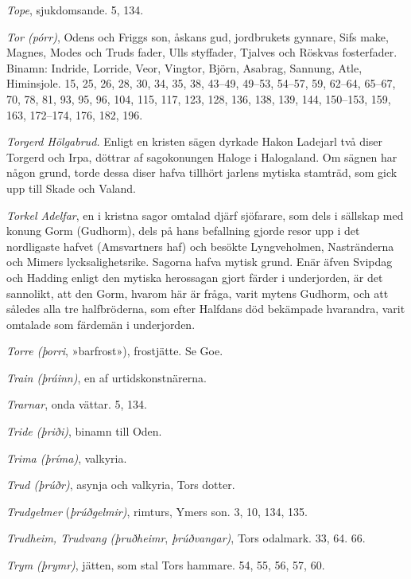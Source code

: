 \emph{Tope}, sjukdomsande. 5, 134.

\emph{Tor (pórr)}, Odens och Friggs son, åskans gud, jordbrukets
gynnare, Sifs make, Magnes, Modes och Truds fader, Ulls styffader,
Tjalves och Röskvas fosterfader. Binamn: Indride, Lorride, Veor,
Vingtor, Björn, Asabrag, Sannung, Atle, Himinsjole. 15, 25, 26, 28, 30,
34, 35, 38, 43--49, 49--53, 54--57, 59, 62--64, 65--67, 70, 78, 81, 93,
95, 96, 104, 115, 117, 123, 128, 136, 138, 139, 144, 150--153, 159, 163,
172--174, 176, 182, 196.

\emph{Torgerd Hölgabrud.} Enligt en kristen sägen dyrkade Hakon Ladejarl
två diser Torgerd och Irpa, döttrar af sagokonungen Haloge i
Halogaland\protect\hypertarget{lb1625905.xhtmlux5cux23start242}{}{}\protect\hypertarget{lb1625905.xhtmlux5cux23start242-a}{}{}\protect\hypertarget{lb1625905.xhtmlux5cux23start242-b}{}{}\protect\hypertarget{lb1625905.xhtmlux5cux23start242-c}{}{}\protect\hypertarget{lb1625905.xhtmlux5cux23start242-d}{}{}.
Om sägnen har någon grund, torde dessa diser hafva tillhört jarlens
mytiska stamträd, som gick upp till Skade och Valand.

\emph{Torkel Adelfar}, en i kristna sagor omtalad djärf sjöfarare, som
dels i sällskap med konung Gorm (Gudhorm), dels på hans befallning
gjorde resor upp i det nordligaste hafvet (Amsvartners haf) och besökte
Lyngveholmen, Nastränderna och Mimers lycksalighetsrike. Sagorna hafva
mytisk grund. Enär äfven Svipdag och Hadding enligt den mytiska
herossagan gjort färder i underjorden, är det sannolikt, att den Gorm,
hvarom här är fråga, varit mytens Gudhorm, och att således alla tre
halfbröderna, som efter Halfdans död bekämpade hvarandra, varit omtalade
som färdemän i underjorden.

\emph{Torre (þorri}, »barfrost»), frostjätte. Se Goe.

\emph{Train (þráinn)}, en af urtidskonstnärerna.

\emph{Trarnar}, onda vättar. 5, 134.

\emph{Tride (þriði)}, binamn till Oden.

\emph{Trima (þríma)}, valkyria.

\emph{Trud (þrúðr)}, asynja och valkyria, Tors dotter.

\emph{Trudgelmer} (\emph{þrúðgelmir)}, rimturs, Ymers son. 3, 10, 134,
135.

\emph{Trudheim, Trudvang (þruðheimr}, \emph{þrúðvangar)}, Tors odalmark.
33, 64. 66.

\emph{Trym (þrymr)}, jätten, som stal Tors hammare. 54, 55, 56, 57, 60.


